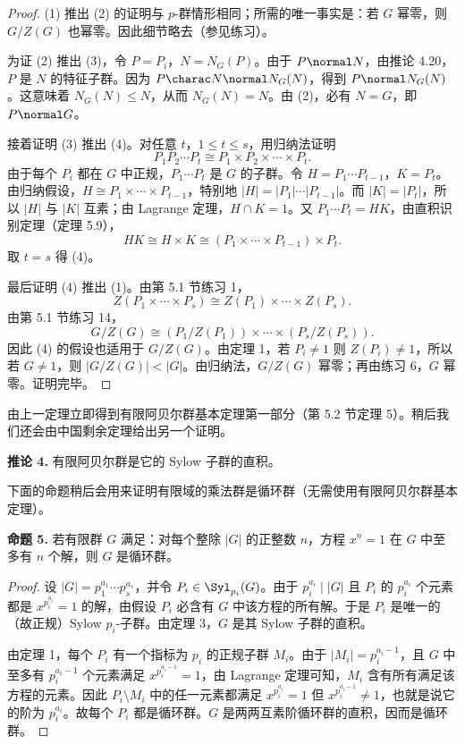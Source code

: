 \begin{proof}
(1) 推出 (2) 的证明与 $p$-群情形相同；所需的唯一事实是：若 $G$ 幂零，则 $G/Z(G)$ 也幂零。因此细节略去（参见练习）。

为证 (2) 推出 (3)，令 $P=P_i$，$N=N_G(P)$。由于 $P\normal N$，由推论 4.20，$P$ 是 $N$ 的特征子群。因为 $P\charac N\normal N_G(N)$，得到 $P\normal N_G(N)$。这意味着 $N_G(N)\leq N$，从而 $N_G(N)=N$。由 (2)，必有 $N=G$，即 $P\normal G$。

接着证明 (3) 推出 (4)。对任意 $t$，$1\leq t\leq s$，用归纳法证明
\[
  P_1P_2\cdots P_t\cong P_1\times P_2\times\cdots\times P_t.
\]
由于每个 $P_i$ 都在 $G$ 中正规，$P_1\cdots P_t$ 是 $G$ 的子群。令 $H=P_1\cdots P_{t-1}$，$K=P_t$。由归纳假设，$H\cong P_1\times\cdots\times P_{t-1}$，特别地 $|H|=|P_1|\cdots |P_{t-1}|$。而 $|K|=|P_t|$，所以 $|H|$ 与 $|K|$ 互素；由 Lagrange 定理，$H\cap K=1$。又 $P_1\cdots P_t=HK$，由直积识别定理（定理 5.9），
\[
  HK\cong H\times K\cong (P_1\times\cdots\times P_{t-1})\times P_t.
\]
取 $t=s$ 得 (4)。

最后证明 (4) 推出 (1)。由第 5.1 节练习 1，
\[
  Z(P_1\times\cdots\times P_s)\cong Z(P_1)\times\cdots\times Z(P_s).
\]
由第 5.1 节练习 14，
\[
  G/Z(G)\cong (P_1/Z(P_1))\times\cdots\times(P_s/Z(P_s)).
\]
因此 (4) 的假设也适用于 $G/Z(G)$。由定理 1，若 $P_i\neq 1$ 则 $Z(P_i)\neq 1$，所以若 $G\neq 1$，则 $|G/Z(G)|<|G|$。由归纳法，$G/Z(G)$ 幂零；再由练习 6，$G$ 幂零。证明完毕。
\end{proof}

由上一定理立即得到有限阿贝尔群基本定理第一部分（第 5.2 节定理 5）。稍后我们还会由中国剩余定理给出另一个证明。

\medskip
\noindent\textbf{推论 4.} 有限阿贝尔群是它的 Sylow 子群的直积。

下面的命题稍后会用来证明有限域的乘法群是循环群（无需使用有限阿贝尔群基本定理）。

\medskip
\noindent\textbf{命题 5.} 若有限群 $G$ 满足：对每个整除 $|G|$ 的正整数 $n$，方程 $x^n=1$ 在 $G$ 中至多有 $n$ 个解，则 $G$ 是循环群。

\begin{proof}
设 $|G|=p_1^{a_1}\cdots p_s^{a_s}$，并令 $P_i\in\Syl_{p_i}(G)$。由于 $p_i^{a_i}\mid |G|$ 且 $P_i$ 的 $p_i^{a_i}$ 个元素都是 $x^{p_i^{a_i}}=1$ 的解，由假设 $P_i$ 必含有 $G$ 中该方程的所有解。于是 $P_i$ 是唯一的（故正规）Sylow $p_i$-子群。由定理 3，$G$ 是其 Sylow 子群的直积。

由定理 1，每个 $P_i$ 有一个指标为 $p_i$ 的正规子群 $M_i$。由于 $|M_i|=p_i^{a_i-1}$，且 $G$ 中至多有 $p_i^{a_i-1}$ 个元素满足 $x^{p_i^{a_i-1}}=1$，由 Lagrange 定理可知，$M_i$ 含有所有满足该方程的元素。因此 $P_i\setminus M_i$ 中的任一元素都满足 $x^{p_i^{a_i}}=1$ 但 $x^{p_i^{a_i-1}}\neq 1$，也就是说它的阶为 $p_i^{a_i}$。故每个 $P_i$ 都是循环群。$G$ 是两两互素阶循环群的直积，因而是循环群。
\end{proof}

